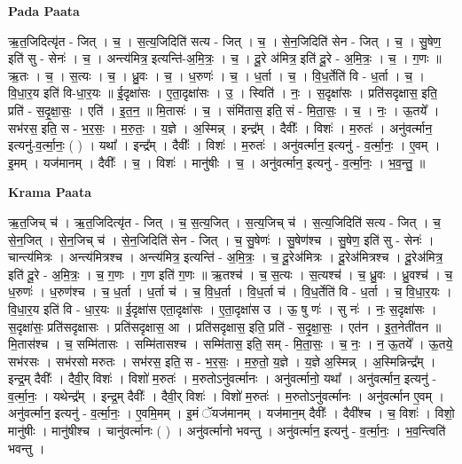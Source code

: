 \documentclass[17pt]{extarticle}
\begin{document}
\textbf{Pada Paata} \newline

ऋ॒त॒जिदित्यृ॑त - जित् । च॒ । स॒त्य॒जिदिति॑ सत्य - जित् । च॒ । से॒न॒जिदिति॑ सेन - जित् । च॒ । सु॒षेण॒ इति॑ सु - सेनः॑ । च॒ । अन्त्य॑मित्र॒ इत्यन्ति॑-अ॒मि॒त्रः॒ । च॒ । दू॒रे अ॑मित्र॒ इति॑ दू॒रे - अ॒मि॒त्रः॒ । च॒ । ग॒णः ॥ ऋ॒तः । च॒ । स॒त्यः । च॒ । ध्रु॒वः । च॒ । ध॒रुणः॑ । च॒ । ध॒र्ता । च॒ । वि॒ध॒र्तेति॑ वि - ध॒र्ता । च॒ । वि॒धा॒र॒य इति॑ वि-धा॒र॒यः ॥ ई॒दृक्षा॑सः । ए॒ता॒दृक्षा॑सः । उ॒ । स्विति॑ । नः॒ । स॒दृक्षा॑सः । प्रति॑सदृक्षास॒ इति॒ प्रति॑ - स॒दृ॒क्षा॒सः॒ । एति॑ । इ॒त॒न॒ ॥ मि॒तासः॑ । च॒ । संमि॑तास॒ इति॒ सं - मि॒ता॒सः॒ । च॒ । नः॒ । ऊ॒तये᳚ । सभ॑रस॒ इति॒ स - भ॒र॒सः॒ । म॒रु॒तः॒ । य॒ज्ञे । अ॒स्मिन्न् । इन्द्र᳚म् । दैवीः᳚ । विशः॑ । म॒रुतः॑ । अनु॑वर्त्मान॒ इत्यनु॑-व॒र्त्मा॒नः॒ ( ) । यथा᳚ । इन्द्र᳚म् । दैवीः᳚ । विशः॑ । म॒रुतः॑ । अनु॑वर्त्मान॒ इत्यनु॑ - व॒र्त्मा॒नः॒ । ए॒वम् । इ॒मम् । यज॑मानम् । दैवीः᳚ । च॒ । विशः॑ । मानु॑षीः । च॒ । अनु॑वर्त्मान॒ इत्यनु॑ - व॒र्त्मा॒नः॒ । भ॒व॒न्तु॒ ॥  \newline


\textbf{Krama Paata} \newline

ऋ॒त॒जिच् च॑ । ऋ॒त॒जिदित्यृ॑त - जित् । च॒ स॒त्य॒जित् । स॒त्य॒जिच् च॑ । स॒त्य॒जिदिति॑ सत्य - जित् । च॒ से॒न॒जित् । से॒न॒जिच् च॑ । से॒न॒जिदिति॑ सेन - जित् । च॒ सु॒षेणः॑ । सु॒षेण॑श्च । सु॒षेण॒ इति॑ सु - सेनः॑ । चान्त्य॑मित्रः । अन्त्य॑मित्रश्च । अन्त्य॑मित्र॒ इत्यन्ति॑ - अ॒मि॒त्रः॒ । च॒ दू॒रेअ॑मित्रः । दू॒रेअ॑मित्रश्च । दू॒रेअ॑मित्र॒ इति॑ दू॒रे - अ॒मि॒त्रः॒ । च॒ ग॒णः । ग॒ण इति॑ ग॒णः ॥ ऋ॒तश्च॑ । च॒ स॒त्यः । स॒त्यश्च॑ । च॒ ध्रु॒वः । ध्रु॒वश्च॑ । च॒ ध॒रुणः॑ । ध॒रुण॑श्च । च॒ ध॒र्ता । ध॒र्ता च॑ । च॒ वि॒ध॒र्ता । वि॒ध॒र्ता च॑ । वि॒ध॒र्तेति॑ वि - ध॒र्ता । च॒ वि॒धा॒र॒यः । वि॒धा॒र॒य इति॑ वि - धा॒र॒यः ॥ ई॒दृक्षा॑स एता॒दृक्षा॑सः । ए॒ता॒दृक्षा॑स उ । ऊ॒ षु णः॑ । सु नः॑ । नः॒ स॒दृक्षा॑सः । स॒दृक्षा॑सः॒ प्रति॑सदृक्षासः । प्रति॑सदृक्षास॒ आ । प्रति॑सदृक्षास॒ इति॒ प्रति॑ - स॒दृ॒क्षा॒सः॒ । एत॑न । इ॒त॒नेती॑तन ॥ मि॒तास॑श्च । च॒ सम्मि॑तासः । सम्मि॑तासश्च । सम्मि॑तास॒ इति॒ सम् - मि॒ता॒सः॒ । च॒ नः॒ । न॒ ऊ॒तये᳚ । ऊ॒तये॒ सभ॑रसः । सभ॑रसो मरुतः । सभ॑रस॒ इति॒ स - भ॒र॒सः॒ । म॒रु॒तो॒ य॒ज्ञे । य॒ज्ञे अ॒स्मिन्न् । अ॒स्मिन्निन्द्र᳚म् । इन्द्र॒म् दैवीः᳚ । दैवी॒र् विशः॑ । विशो॑ म॒रुतः॑ । म॒रुतोऽनु॑वर्त्मानः । अनु॑वर्त्मानो॒ यथा᳚ । अनु॑वर्त्मान॒ इत्यनु॑ - व॒र्त्मा॒नः॒ । यथेन्द्र᳚म् । इन्द्र॒म् दैवीः᳚ । दैवी॒र् विशः॑ । विशो॑ म॒रुतः॑ । म॒रुतोऽनु॑वर्त्मानः । अनु॑वर्त्मान ए॒वम् । अनु॑वर्त्मान॒ इत्यनु॑ - व॒र्त्मा॒नः॒ । 
ए॒वमि॒मम् । इ॒मं ॅयज॑मानम् । यज॑मान॒म् दैवीः᳚ । दैवी᳚श्च । च॒ विशः॑ । विशो॒ मानु॑षीः । मानु॑षीश्च । चानु॑वर्त्मानः ( ) । अनु॑वर्त्मानो भवन्तु । अनु॑वर्त्मान॒ इत्यनु॑ - व॒र्त्मा॒नः॒ । भ॒व॒न्त्विति॑ भवन्तु । \newline
\end{document}
